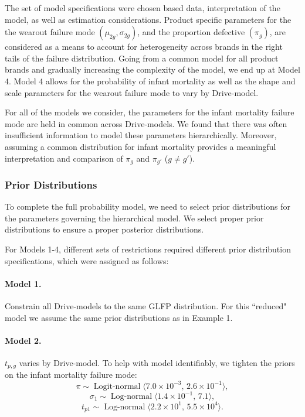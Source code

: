 \documentclass[12pt]{article}
\newcommand{\op}{\operatorname}
\begin{document}
The set of model specifications were chosen based data, interpretation of the model, as well as estimation considerations.  Product specific parameters for the the wearout failure mode $(\mu_{2g},\sigma_{2g})$, and the proportion defective $(\pi_g)$, are considered as a means to account for heterogeneity across brands in the right tails of the failure distribution.  Going from a common model for all product brands and gradually increasing the complexity of the model, we end up at Model 4.  Model 4 allows for the probability of infant mortality as well as the shape and scale parameters for the wearout failure mode to vary by Drive-model.

For all of the models we consider, the parameters for the infant mortality failure mode are held in common across Drive-models.  We found that there was often insufficient information to model these parameters hierarchically.  Moreover, assuming a common distribution for infant mortality provides a meaningful interpretation and comparison of $\pi_g$ and $\pi_{g'}$ ($g \neq g'$). 

\subsubsection{Prior Distributions}
\label{sec:Prior Distributions}
To complete the full probability model, we need to select prior distributions for the parameters governing the hierarchical model. We select proper prior distributions to ensure a proper posterior distributions.

For Models 1-4, different sets of restrictions required different prior distribution specifications, which were assigned as follows:

\paragraph{Model 1.} Constrain all Drive-models to the same GLFP distribution. For this ``reduced" model we assume the same prior distributions as in Example 1.

\paragraph{Model 2.} $t_{p,g}$ varies by Drive-model. To help with model identifiably, we tighten the priors on the infant mortality failure mode:
$$ \pi \sim \op{Logit-normal}\langle 7.0\times 10^{-3},\, 2.6 \times 10^{-1} \rangle,$$
$$\sigma_1 \sim \op{Log-normal}\langle 1.4 \times 10^{-1},\, 7.1\rangle,$$ 
$$t_{p1} \sim \op{Log-normal} \langle 2.2 \times 10^1,\, 5.5 \times 10^{4} \rangle.$$
\end{document}
